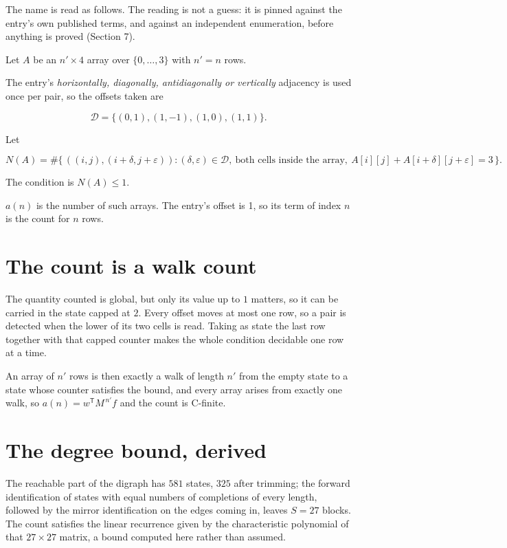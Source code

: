 \documentclass[11pt]{article}
\theoremstyle{definition}
\begin{document}
The name is read as follows. The reading is not a guess: it is pinned against the entry's own published terms, and against an independent enumeration, before anything is proved (Section 7).

Let $A$ be an $n' \times 4$ array over $\{0,\dots,3\}$ with $n' = n$ rows.

The entry's {\itshape horizontally, diagonally, antidiagonally or vertically} adjacency is used once per pair, so the offsets taken are

\[\mathcal{D} = \{(0,1), (1,-1), (1,0), (1,1)\}.\]

Let

\[N(A) = \#\bigl\{\,((i,j),(i{+}\delta,j{+}\varepsilon)) : (\delta,\varepsilon) \in \mathcal{D},\ \text{both cells inside the array},\ A[i][j] + A[i{+}\delta][j{+}\varepsilon] = 3\,\bigr\}.\]

The condition is $N(A) \le 1$.

$a(n)$ is the number of such arrays. The entry's offset is 1, so its term of index $n$ is the count for $n$ rows.

\section{The count is a walk count}

The quantity counted is global, but only its value up to $1$ matters, so it can be carried in the state capped at $2$. Every offset moves at most one row, so a pair is detected when the lower of its two cells is read. Taking as state the last row together with that capped counter makes the whole condition decidable one row at a time.

An array of $n'$ rows is then exactly a walk of length $n'$ from the empty state to a state whose counter satisfies the bound, and every array arises from exactly one walk, so $a(n) = w^{\mathsf T}M^{\,n'}f$ and the count is C-finite.

\section{The degree bound, derived}

The reachable part of the digraph has $581$ states, $325$ after trimming; the forward identification of states with equal numbers of completions of every length, followed by the mirror identification on the edges coming in, leaves $S = 27$ blocks. The count satisfies the linear recurrence given by the characteristic polynomial of that $27\times27$ matrix, a bound computed here rather than assumed.
\end{document}
